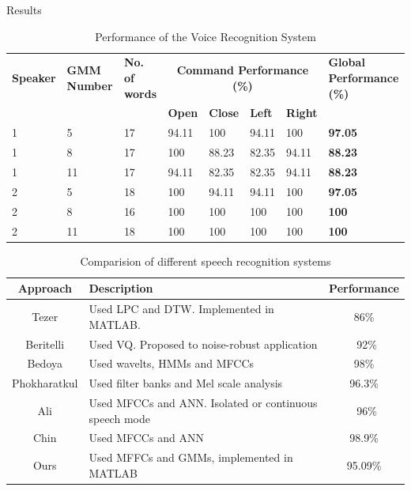\documentclass[final]{beamer}
\begin{document}
\begin{frame}{}
\begin{textblock}{39.5}
\begin{block}{Results}

\begin{table}[h]
\centering
\footnotesize
\begin{tabular}{||p{3.5cm}||p{4cm}||p{3cm}||p{4cm}||p{4cm}||p{4cm}||p{4cm}||p{6cm}||}%
\hline 
\textbf{Speaker} &  \textbf{GMM Number} & \textbf{No. of words} & \multicolumn{4}{|c||}{\textbf{Command Performance (\%)}} & \textbf{Global Performance (\%)}\\
\cline{4-7}
& & & \textbf{Open} & \textbf{Close} & \textbf{Left} & \textbf{Right} & \\
\hline \hline

1 &5 &17 &94.11 &100 &94.11 &100 & \textbf{97.05} \\
\hline 
1 &8 &17 &100 &88.23 &82.35 &94.11 &\textbf{88.23} \\
\hline
1 &11 &17 &94.11 &82.35 &82.35 &94.11 &\textbf{88.23} \\
\hline
2 &5 &18 &100 &94.11 &94.11 &100 & \textbf{97.05}\\
\hline
2 &8 &16 &100 &100 &100 &100 & \textbf{100}\\
\hline
2 &11 &18 &100 &100 &100 &100 & \textbf{100}\\
\hline

\end{tabular}
\caption{Performance of the Voice Recognition System}
\label{performance}
\end{table}

\begin{table}[!ht]
	\small
	\begin{center}	
	\begin{tabular}{|c | p{17.5cm} | c|}
	\hline
	\textbf{Approach} & \textbf{Description} & \textbf{Performance} \\
	\hline
	\hline
	Tezer \cite{Tezer} &
		Used LPC and DTW. Implemented in MATLAB. &
		86\% \\
	Beritelli \cite{Beritelli} &
		Used VQ. Proposed to noise-robust application &
		~92\% \\
	Bedoya \cite{Bedoya} &
		Used wavelts, HMMs and MFCCs &
		98\% \\
	Phokharatkul \cite{Phokharatkul} &
		Used filter banks and Mel scale analysis &
		96.3\% \\
	Ali \cite{Ali} &
		Used MFCCs and ANN. Isolated or continuous speech mode &
		~96\% \\
	Chin \cite{Chin} &
		Used MFCCs and ANN&
		98.9\% \\
	Ours &
		Used MFFCs and GMMs, implemented in MATLAB &
		95.09\%\\
	\hline
	\end{tabular}
	\end{center}	
	\caption{Comparision of different speech recognition systems}
	\label{table_comp}
\end{table}


\end{block}
\end{textblock}
\end{frame}
\end{document}
